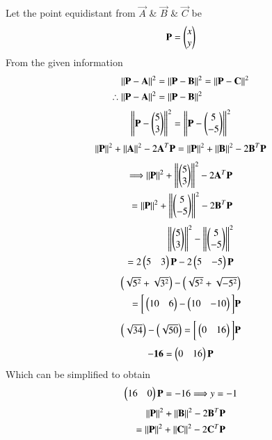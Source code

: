 \documentclass[journal,12pt,twocolumn]{IEEEtran}
\begin{document}
Let the point equidistant from $\Vec{A}$ \& $\Vec{B}$ \& $\Vec{C}$ be 
\begin{align}
    \Vec{P}=\myvec{x\\y}
\end{align}
From the given information 
\begin{align}
    \norm{\Vec{P}-\vec{A}}^2 &= \norm{\vec{P}-\vec{B}}^2 = \norm{\vec{P}-\vec{C}}^2\\
\therefore
    \norm{\Vec{P}-\vec{A}}^2 &= \norm{\vec{P}-\vec{B}}^2
\end{align}
\begin{align}
    \left\lVert\mathbf{P}-\begin{pmatrix}5\\3\end{pmatrix}\right\rVert^2 =\left\lVert\mathbf{P} - \begin{pmatrix}5\\-5\end{pmatrix}\right\rVert^2
    \end{align}
    \begin{align}
    \left\lVert\mathbf{P}\right\rVert^2 + \left\lVert\mathbf{A}\right\rVert^2 -2\mathbf{A}^T\mathbf{P} = \left\lVert\mathbf{P}\right\rVert^2 + \left\lVert\mathbf{B}\right\rVert^2 -2\mathbf{B}^T\mathbf{P}
\end{align}
\begin{align} 
    \Longrightarrow \left\lVert\mathbf{P}\right\rVert^2 + \left\lVert\begin{pmatrix}5\\3\end{pmatrix}\right\rVert^2 -2\mathbf{A}^T\mathbf{P}\\ = \left\lVert\mathbf{P}\right\rVert^2 + \left\lVert\begin{pmatrix}5\\-5\end{pmatrix}\right\rVert^2 -2\mathbf{B}^T\mathbf{P}
\end{align}
\begin{align}
    \left\lVert\begin{pmatrix}5\\3\end{pmatrix}\right\rVert^2 -\left\lVert\begin{pmatrix}5\\-5\end{pmatrix}\right\rVert^2 \\= 2\begin{pmatrix}5& 3\end{pmatrix}\mathbf{P} -2\begin{pmatrix}5&-5\end{pmatrix}\mathbf{P}
    \end{align}
    \begin{align}
    \begin{pmatrix}\sqrt{5^2}+\sqrt{3^2}\end{pmatrix} -\begin{pmatrix}\sqrt{5^2}+\sqrt{-5^2}\end{pmatrix} \\=                  \bigg[\begin{pmatrix}10&6\end{pmatrix} - \begin{pmatrix}10&-10\end{pmatrix}\bigg]\mathbf{P}
\end{align}
\begin{align}
    \begin{pmatrix}\sqrt{34}\end{pmatrix} -\begin{pmatrix}\sqrt{50}\end{pmatrix}                      =\bigg[\begin{pmatrix}0&16\end{pmatrix}\bigg]\mathbf{P}
\end{align}
\begin{align}
    \mathbf{-16} = \begin{pmatrix}0&16\end{pmatrix}\mathbf{P}
\end{align}
Which can be simplified to obtain 
\begin{align}
    \begin{pmatrix}16&0\end{pmatrix}\mathbf{P} = -16
    \Longrightarrow y = -1
\end{align}
\begin{align}
    \left\lVert\mathbf{P}\right\rVert^2 + \left\lVert\mathbf{B}\right\rVert^2 -2\mathbf{B}^T\mathbf{P} \\= \left\lVert\mathbf{P}\right\rVert^2 + \left\lVert\mathbf{C}\right\rVert^2 -2\mathbf{C}^T\mathbf{P}
\end{align}
\end{document}
